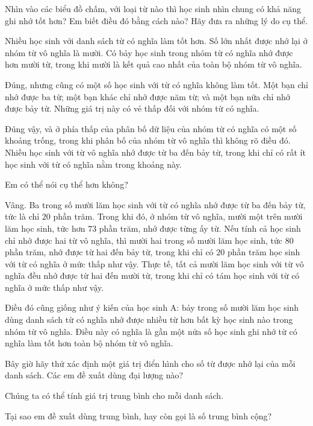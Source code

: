 \documentclass[
  10pt,
  a4paper,
  landscape,
  twoside,
  openany
]{scrbook}
\newlength{\scriptlabelwidth}
\newcommand{\scriptlabel}[1]{%
  \normalfont\slshape\makebox[\scriptlabelwidth][l]{#1}%
}
\newenvironment{scriptlist}{%
  \begin{list}{}{%
    \setlength{\labelwidth}{\scriptlabelwidth}%
    \setlength{\labelsep}{0.6em}%
    \setlength{\leftmargin}{\dimexpr\labelwidth+\labelsep\relax}%
    \setlength{\itemindent}{0pt}%
    \setlength{\listparindent}{0pt}%
    \setlength{\parsep}{0pt}%
    \setlength{\itemsep}{0.35\baselineskip}%
    \setlength{\topsep}{0.35\baselineskip}%
    \let\makelabel\scriptlabel
  }%
}{%
  \end{list}%
}
\begin{document}
{\begin{scriptlist}
  \item [Giáo viên:] Nhìn vào các biểu đồ chấm, với loại từ nào thì học sinh nhìn chung có khả năng ghi nhớ tốt hơn? Em biết điều đó bằng cách nào? Hãy đưa ra những lý do cụ thể.
  \item [Học sinh A:]  Nhiều học sinh với danh sách từ có nghĩa làm tốt hơn. Số lớn nhất được nhớ lại ở nhóm từ vô nghĩa là mười. Có bảy học sinh trong nhóm từ có nghĩa nhớ được hơn mười từ, trong khi mười là kết quả cao nhất của toàn bộ nhóm từ vô nghĩa.
  \item [Học sinh B:] Đúng, nhưng cũng có một số học sinh với từ có nghĩa không làm tốt. Một bạn chỉ nhớ được ba từ; một bạn khác chỉ nhớ được năm từ; và một bạn nữa chỉ nhớ được bảy từ. Những giá trị này có vẻ thấp đối với nhóm từ có nghĩa.
  \item [Học sinh C:] Đúng vậy, và ở phía thấp của phân bố dữ liệu của nhóm từ có nghĩa có một số khoảng trống, trong khi phân bố của nhóm từ vô nghĩa thì không rõ điều đó. Nhiều học sinh với từ vô nghĩa nhớ được từ ba đến bảy từ, trong khi chỉ có rất ít học sinh với từ có nghĩa nằm trong khoảng này.
  \item [Giáo viên:] Em có thể nói cụ thể hơn không?
  \item [Học sinh C:]Vâng. Ba trong số mười lăm học sinh với từ có nghĩa nhớ được từ ba đến bảy từ, tức là chỉ $20$ phần trăm. Trong khi đó, ở nhóm từ vô nghĩa, mười một trên mười lăm học sinh, tức hơn $73$ phần trăm, nhớ được từng ấy từ. Nếu tính cả học sinh chỉ nhớ được hai từ vô nghĩa, thì mười hai trong số mười lăm học sinh, tức $80$ phần trăm, nhớ được từ hai đến bảy từ, trong khi chỉ có $20$ phần trăm học sinh với từ có nghĩa ở mức thấp như vậy. Thực tế, tất cả mười lăm học sinh với từ vô nghĩa đều nhớ được từ hai đến mười từ, trong khi chỉ có tám học sinh với từ có nghĩa ở mức thấp như vậy. 
  \item [Giáo viên:] Điều đó cũng giống như ý kiến của học sinh A: bảy trong số mười lăm học sinh dùng danh sách từ có nghĩa nhớ được nhiều từ hơn bất kỳ học sinh nào trong nhóm từ vô nghĩa. Điều này có nghĩa là gần một nửa số học sinh ghi nhớ từ có nghĩa làm tốt hơn toàn bộ nhóm từ vô nghĩa.
  \item [Giáo viên:] Bây giờ hãy thử xác định một giá trị điển hình cho số từ được nhớ lại của mỗi danh sách. Các em đề xuất dùng đại lượng nào?
  \item [Học sinh D:] Chúng ta có thể tính giá trị trung bình cho mỗi danh sách.
  \item [Giáo viên:] Tại sao em đề xuất dùng trung bình, hay còn gọi là số trung bình cộng?

\end{scriptlist}}
\end{document}
